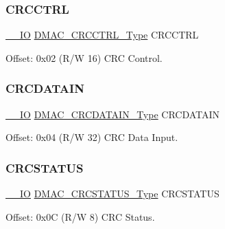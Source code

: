 \mbox{\label{struct_dmac_a8cff57cdf7087fb7578c13f27baa6756}} 
\subsubsection{\texorpdfstring{CRCCTRL}{CRCCTRL}}
{\footnotesize\ttfamily \mbox{\hyperlink{core__cm0plus_8h_aec43007d9998a0a0e01faede4133d6be}{\+\_\+\+\_\+\+IO}} \mbox{\hyperlink{union_d_m_a_c___c_r_c_c_t_r_l___type}{D\+M\+A\+C\+\_\+\+C\+R\+C\+C\+T\+R\+L\+\_\+\+Type}} C\+R\+C\+C\+T\+RL}



Offset\+: 0x02 (R/W 16) C\+RC Control. 

\mbox{\label{struct_dmac_accb22162a1c2577d47964bcccdbea0fc}} 
\subsubsection{\texorpdfstring{CRCDATAIN}{CRCDATAIN}}
{\footnotesize\ttfamily \mbox{\hyperlink{core__cm0plus_8h_aec43007d9998a0a0e01faede4133d6be}{\+\_\+\+\_\+\+IO}} \mbox{\hyperlink{union_d_m_a_c___c_r_c_d_a_t_a_i_n___type}{D\+M\+A\+C\+\_\+\+C\+R\+C\+D\+A\+T\+A\+I\+N\+\_\+\+Type}} C\+R\+C\+D\+A\+T\+A\+IN}



Offset\+: 0x04 (R/W 32) C\+RC Data Input. 

\mbox{\label{struct_dmac_af66ca4b9f5a6270cd37a5322e41e27af}} 
\subsubsection{\texorpdfstring{CRCSTATUS}{CRCSTATUS}}
{\footnotesize\ttfamily \mbox{\hyperlink{core__cm0plus_8h_aec43007d9998a0a0e01faede4133d6be}{\+\_\+\+\_\+\+IO}} \mbox{\hyperlink{union_d_m_a_c___c_r_c_s_t_a_t_u_s___type}{D\+M\+A\+C\+\_\+\+C\+R\+C\+S\+T\+A\+T\+U\+S\+\_\+\+Type}} C\+R\+C\+S\+T\+A\+T\+US}



Offset\+: 0x0C (R/W 8) C\+RC Status. 

\mbox{\label{struct_dmac_a58f09c87a750300ff7f9f93be50a0e8c}} 
